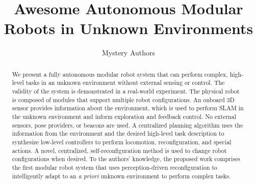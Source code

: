 \documentclass[conference]{IEEEtran}
\begin{document}
\title{Awesome Autonomous Modular Robots in Unknown Environments}

\author{Mystery Authors}


\maketitle

\begin{abstract}

We present a fully autonomous modular robot system that can perform complex, high-level tasks in an unknown environment without external sensing or control. The validity of the system is demonstrated in a real-world experiment. The physical robot is composed of modules that support multiple robot configurations. An onboard 3D sensor provides information about the environment, which is used to perform SLAM in the unknown environment and inform exploration and feedback control. No external sensors, pose providers, or beacons are used. A centralized planning algorithm uses the information from the environment and the desired high-level task description to synthesize low-level controllers to perform locomotion, reconfiguration, and special actions. A novel, centralized, self-reconfiguration method is used to change robot configurations when desired. To the authors' knowledge, the proposed work comprises the first modular robot system that uses perception-driven reconfiguration to intelligently adapt to an \textit{a priori} unknown environment to perform complex tasks.



\end{abstract}

\IEEEpeerreviewmaketitle

\end{document}
